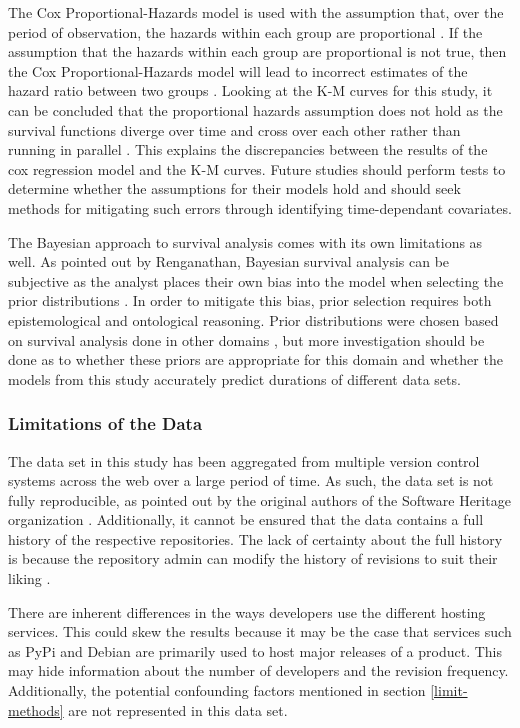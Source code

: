 \documentclass[acmconf]{acmart}
\begin{document}
The Cox Proportional-Hazards model is used with the assumption that, over the period of observation, the hazards within each group are proportional \cite{stel2011cox}.
If the assumption that the hazards within each group are proportional is not true, then the Cox Proportional-Hazards model will lead to incorrect estimates of the hazard ratio between two groups \cite{stel2011cox}.
Looking at the K-M curves for this study, it can be concluded that the proportional hazards assumption does not hold as the survival functions diverge over time and cross over each other rather than running in parallel \cite{persson2007ACO}.
This explains the discrepancies between the results of the cox regression model and the K-M curves.
Future studies should perform tests to determine whether the assumptions for their models hold and should seek methods for mitigating such errors through identifying time-dependant covariates.

The Bayesian approach to survival analysis comes with its own limitations as well.
As pointed out by Renganathan, Bayesian survival analysis can be subjective as the analyst places their own bias into the model when selecting the prior distributions \cite{renganathan2016overview}.
In order to mitigate this bias, prior selection requires both epistemological and ontological reasoning. Prior distributions were chosen based on survival analysis done in other domains \cite{kelter2020bayesian, rethinking}, but more investigation should be done as to whether these priors are appropriate for this domain and whether the models from this study accurately predict durations of different data sets.

\subsubsection{Limitations of the Data}

The data set in this study has been aggregated from multiple version control systems across the web over a large period of time.
As such, the data set is not fully reproducible, as pointed out by the original authors of the Software Heritage organization \cite{pietri2019software}.
Additionally, it cannot be ensured that the data contains a full history of the respective repositories.
The lack of certainty about the full history is because the repository admin can modify the history of revisions to suit their liking \cite{perils2009}.

There are inherent differences in the ways developers use the different hosting services.
This could skew the results because it may be the case that services such as PyPi and Debian are primarily used to host major releases of a product.
This may hide information about the number of developers and the revision frequency.
Additionally, the potential confounding factors mentioned in section \ref{limit-methods} are not represented in this data set.
\end{document}
